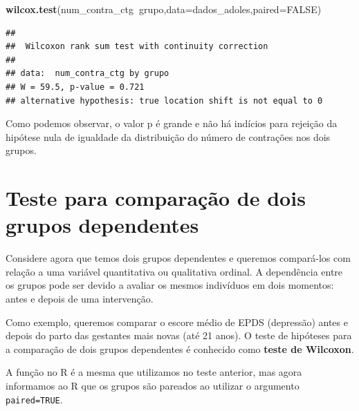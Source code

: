 \documentclass[
]{book}
\newenvironment{Shaded}{\begin{snugshade}}{\end{snugshade}}
\newcommand{\DataTypeTok}[1]{\textcolor[rgb]{0.13,0.29,0.53}{#1}}
\newcommand{\KeywordTok}[1]{\textcolor[rgb]{0.13,0.29,0.53}{\textbf{#1}}}
\newcommand{\NormalTok}[1]{#1}
\newcommand{\OperatorTok}[1]{\textcolor[rgb]{0.81,0.36,0.00}{\textbf{#1}}}
\newcommand{\OtherTok}[1]{\textcolor[rgb]{0.56,0.35,0.01}{#1}}
\begin{document}
\begin{Shaded}
\begin{Highlighting}[]
\KeywordTok{wilcox.test}\NormalTok{(num_contra_ctg}\OperatorTok{~}\NormalTok{grupo,}\DataTypeTok{data=}\NormalTok{dados_adoles,}\DataTypeTok{paired=}\OtherTok{FALSE}\NormalTok{)}
\end{Highlighting}
\end{Shaded}

\begin{verbatim}
## 
## 	Wilcoxon rank sum test with continuity correction
## 
## data:  num_contra_ctg by grupo
## W = 59.5, p-value = 0.721
## alternative hypothesis: true location shift is not equal to 0
\end{verbatim}

Como podemos observar, o valor p é grande e não há indícios para rejeição da hipótese nula de igualdade da distribuição do número de contrações nos dois grupos.

\hypertarget{teste-para-comparauxe7uxe3o-de-dois-grupos-dependentes}{%
\section{Teste para comparação de dois grupos dependentes}\label{teste-para-comparauxe7uxe3o-de-dois-grupos-dependentes}}

Considere agora que temos dois grupos dependentes e queremos compará-los com relação a uma variável quantitativa ou qualitativa ordinal. A dependência entre os grupos pode ser devido a avaliar os mesmos indivíduos em dois momentos: antes e depois de uma intervenção.

Como exemplo, queremos comparar o escore médio de EPDS (depressão) antes e depois do parto das gestantes mais novas (até 21 anos). O teste de hipóteses para a comparação de dois grupos dependentes é conhecido como \textbf{teste de Wilcoxon}.

A função no R é a mesma que utilizamos no teste anterior, mas agora informamos ao R que os grupos são pareados ao utilizar o argumento \texttt{paired=TRUE}.

\begin{Shaded}
\end{Shaded}
\end{document}
